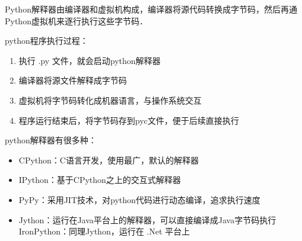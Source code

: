 
\begin{issues}
\issueTODO
\end{issues}


Python解释器由编译器和虚拟机构成，编译器将源代码转换成字节码，然后再通Python虚拟机来逐行执行这些字节码．

python程序执行过程：

\begin{enumerate}
\item 执行 .py 文件，就会启动python解释器

\item 编译器将源文件解释成字节码

\item 虚拟机将字节码转化成机器语言，与操作系统交互

\item 程序运行结束后，将字节码存到pyc文件，便于后续直接执行
\end{enumerate}

python解释器有很多种：

\begin{itemize}
\item CPython：C语言开发，使用最广，默认的解释器

\item IPython：基于CPython之上的交互式解释器

\item PyPy：采用JIT技术，对python代码进行动态编译，追求执行速度

\item Jython：运行在Java平台上的解释器，可以直接编译成Java字节码执行
IronPython：同理Jython，运行在 .Net 平台上
\end{itemize}
